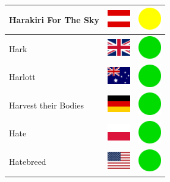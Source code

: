 \documentclass[12pt, a4paper, twoside]{report}
\begin{document}
\begin{center}
\begin{longtable}{|p{5cm}|p{2cm}|p{2cm}|}
 Harakiri For The Sky                                       & \includegraphics[width=1cm]{../img/flags/at} &   \includegraphics[width=1cm]{../likes/m} \\ \hline
 Hark                                                       & \includegraphics[width=1cm]{../img/flags/gb} &   \includegraphics[width=1cm]{../likes/y} \\ \hline
 Harlott                                                    & \includegraphics[width=1cm]{../img/flags/au} &   \includegraphics[width=1cm]{../likes/y} \\ \hline
 Harvest their Bodies                                       & \includegraphics[width=1cm]{../img/flags/de} &   \includegraphics[width=1cm]{../likes/y} \\ \hline
 Hate                                                       & \includegraphics[width=1cm]{../img/flags/pl} &   \includegraphics[width=1cm]{../likes/y} \\ \hline
 Hatebreed                                                  & \includegraphics[width=1cm]{../img/flags/us} &   \includegraphics[width=1cm]{../likes/y} \\ \hline

\end{longtable}
\end{center}
\end{document}
